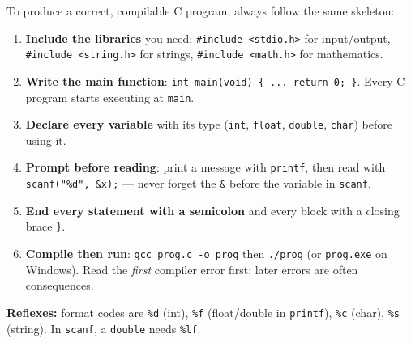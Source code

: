 \documentclass[11pt]{article}
\begin{document}
\begin{methode}
To produce a correct, compilable C program, always follow the same skeleton:
\begin{enumerate}
\item \textbf{Include the libraries} you need: \texttt{\#include <stdio.h>} for input/output, \texttt{\#include <string.h>} for strings, \texttt{\#include <math.h>} for mathematics.
\item \textbf{Write the main function}: \texttt{int main(void) \{ ... return 0; \}}. Every C program starts executing at \texttt{main}.
\item \textbf{Declare every variable} with its type (\texttt{int}, \texttt{float}, \texttt{double}, \texttt{char}) before using it.
\item \textbf{Prompt before reading}: print a message with \texttt{printf}, then read with \texttt{scanf("\%d", \&x);} — never forget the \texttt{\&} before the variable in \texttt{scanf}.
\item \textbf{End every statement with a semicolon} and every block with a closing brace \texttt{\}}.
\item \textbf{Compile then run}: \texttt{gcc prog.c -o prog} then \texttt{./prog} (or \texttt{prog.exe} on Windows). Read the \emph{first} compiler error first; later errors are often consequences.
\end{enumerate}
\textbf{Reflexes:} format codes are \texttt{\%d} (int), \texttt{\%f} (float/double in \texttt{printf}), \texttt{\%c} (char), \texttt{\%s} (string). In \texttt{scanf}, a \texttt{double} needs \texttt{\%lf}.
\end{methode}
\end{document}
